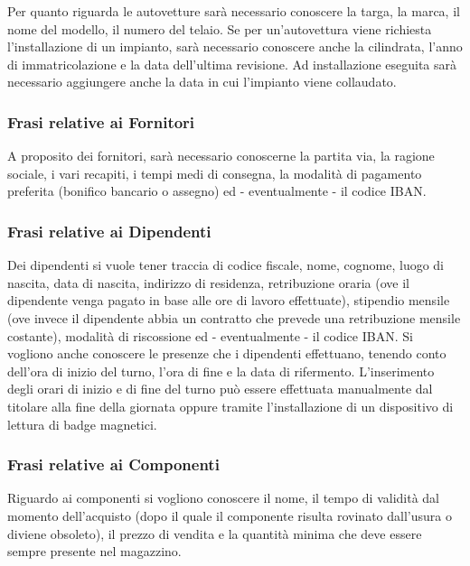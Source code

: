 			Per quanto riguarda le autovetture sarà necessario conoscere la targa, la marca, il nome del modello, il numero del telaio. Se per un’autovettura viene richiesta l’installazione di un impianto, sarà necessario conoscere anche la cilindrata, l’anno di immatricolazione e la data dell’ultima revisione. Ad installazione eseguita sarà necessario aggiungere anche la data in cui l'impianto viene collaudato.
		
		\subsubsection{Frasi relative ai Fornitori}
			
			A proposito dei fornitori, sarà necessario conoscerne la partita via, la ragione sociale, i vari recapiti, i tempi medi di consegna, la modalità di pagamento preferita (bonifico bancario o assegno) ed - eventualmente - il codice IBAN.
		
		\subsubsection{Frasi relative ai Dipendenti} 
			
			Dei dipendenti si vuole tener traccia di codice fiscale, nome, cognome, luogo di nascita, data di nascita, indirizzo di residenza, retribuzione oraria (ove il dipendente venga pagato in base alle ore di lavoro effettuate), stipendio mensile (ove invece il dipendente abbia un contratto che prevede una retribuzione mensile costante), modalità di riscossione ed - eventualmente - il codice IBAN. Si vogliono anche conoscere le presenze che i dipendenti effettuano, tenendo conto dell’ora di inizio del turno, l’ora di fine e la data di rifermento. 
			L'inserimento degli orari di inizio e di fine del turno può essere effettuata manualmente dal titolare alla fine della giornata oppure tramite l'installazione di un dispositivo di lettura di badge magnetici.
			
		\subsubsection{Frasi relative ai Componenti}
			
			Riguardo ai componenti si vogliono conoscere il nome, il tempo di validità dal momento dell'acquisto (dopo il quale il componente risulta rovinato dall'usura o diviene obsoleto), il prezzo di vendita e la quantità minima che deve essere sempre presente nel magazzino.
			
